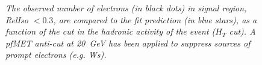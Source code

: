 \begin{figure}[h!]
\caption{\textit{The observed number of electrons (in black dots) in signal region, RelIso $< 0.3$, are compared to the fit prediction (in blue stars), as a function of the cut in the hadronic activity of the event ($H_{T}$ cut). A pfMET anti-cut at 20~GeV has been applied to suppress sources of prompt electrons (e.g. Ws). }}
\label{fig:d_fitprediction}
\end{figure}



